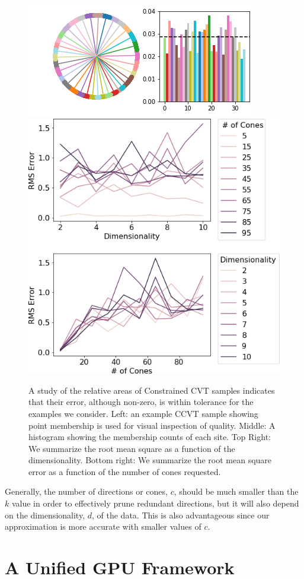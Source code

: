 \begin{figure}
    \includegraphics[width=0.65\linewidth]{figs/chap7/cvt_study_35.png}
    \includegraphics[width=0.32\linewidth]{figs/chap7/scvt.png}
    \caption{A study of the relative areas of Constrained CVT samples indicates that their error, although non-zero, is within tolerance for the examples we consider.
    Left: an example CCVT sample showing point membership is used for visual inspection of quality.
    Middle: A histogram showing the membership counts of each site.
    Top Right: We summarize the root mean square as a function of the dimensionality.
    Bottom right: We summarize the root mean square error as a function of the number of cones requested.}
    \label{fig:cvt_study}
\end{figure}

Generally, the number of directions or cones, $c$, should be much smaller than the $k$ value in order to effectively prune redundant directions, but it will also depend on the dimensionality, $d$, of the data.
%
This is also advantageous since our approximation is more accurate with smaller values of $c$.

\section{A Unified GPU Framework}
\label{sec:gpu_graphs}

